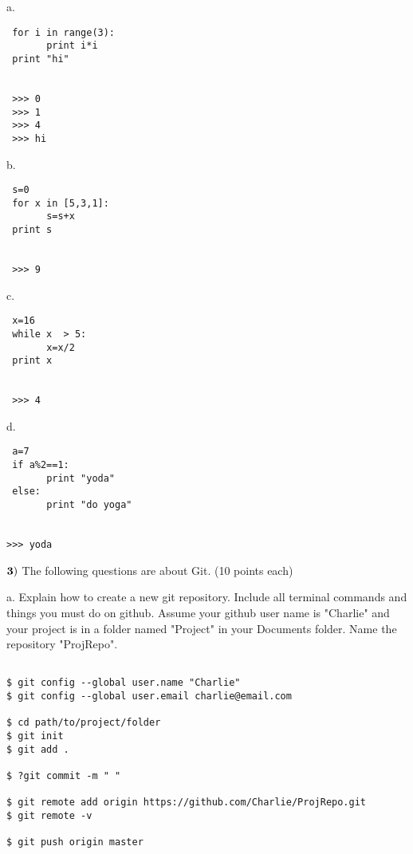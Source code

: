 \documentclass{article}
\begin{document}
 \vspace{1cm}

  
 a.   \begin{verbatim}
 for i in range(3):
       print i*i
 print "hi"
 
 
 >>> 0
 >>> 1
 >>> 4
 >>> hi
 \end{verbatim}
 \vspace{1cm}
 
 b.  \begin{verbatim}
 s=0
 for x in [5,3,1]:
       s=s+x
 print s
 
 
 >>> 9
 \end{verbatim}
 \vspace{1cm}
 
 c.  \begin{verbatim}
 x=16
 while x  > 5:
       x=x/2
 print x
 
 
 >>> 4
 \end{verbatim}
 \vspace{1cm}
 
 d.   \begin{verbatim}
 a=7
 if a%2==1:
       print "yoda"
 else:
       print "do yoga"
       
       
>>> yoda
 \end{verbatim}
 \vspace{1cm}
  \newpage

  
  $\bf{3)}$  The following questions are about Git. (10 points each)
  \vspace{0.5cm}
    
  a.  Explain how to create a new git repository.  Include all terminal commands and things you must do on github.  Assume your github user name is "Charlie" and your project is in a folder named "Project" in your Documents folder.  Name the repository "ProjRepo".
   \begin{verbatim}
  
$ git config --global user.name "Charlie"
$ git config --global user.email charlie@email.com

$ cd path/to/project/folder
$ git init
$ git add .

$ ?git commit -m " "

$ git remote add origin https://github.com/Charlie/ProjRepo.git
$ git remote -v

$ git push origin master



 \end{verbatim}
    \vspace{8cm}
  
\end{document}
